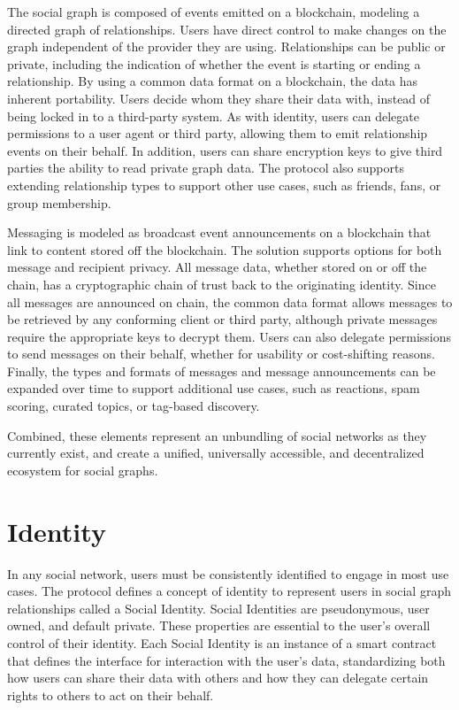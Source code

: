 \documentclass[12pt,letterpaper]{article}
\begin{document}
The social graph is composed of events emitted on a blockchain, modeling a directed graph
of  relationships. Users have direct control to make changes on the graph
independent of the provider they are using. Relationships can be public or private,
including the indication of whether the event is starting or ending a relationship. By
using a common data format on a blockchain, the data has inherent portability. Users
decide whom they share their data with, instead of being locked in to a third-party
system. As with identity, users can delegate permissions to a user agent or third party,
allowing them to emit relationship events on their behalf. In addition, users can share
encryption keys to give third parties the ability to read private graph data. The protocol
also supports extending relationship types to support other use cases, such as friends,
fans, or group membership.

Messaging is modeled as broadcast event announcements on a blockchain that link to content
stored off the blockchain. The solution supports options for both message and recipient
privacy. All message data, whether stored on or off the chain, has a cryptographic chain
of trust back to the originating identity. Since all messages are announced on chain, the
common data format allows messages to be retrieved by any conforming client or third
party, although private messages require the appropriate keys to decrypt them. Users can
also delegate permissions to send messages on their behalf, whether for usability or
cost-shifting reasons. Finally, the types and formats of messages and message
announcements can be expanded over time to support additional use cases, such as
reactions, spam scoring, curated topics, or tag-based discovery.

Combined, these elements represent an unbundling of social networks as they currently
exist, and create a unified, universally accessible, and decentralized ecosystem for
social graphs.

\section{Identity}\label{sec:identity}

In any social network, users must be consistently identified to engage in most use cases.
The protocol defines a concept of identity to represent users in social graph
relationships called a Social Identity. Social Identities are
pseudonymous,\cite{anon_terminology} user owned, and default private. These properties are
essential to the user's overall control of their identity. Each Social Identity is an
instance of a smart contract that defines the interface for interaction with the user's
data, standardizing both how users can share their data with others and how they can
delegate certain rights to others to act on their behalf.
\end{document}
